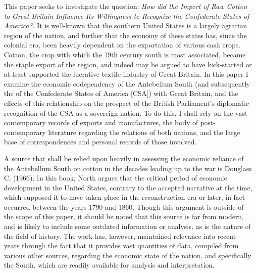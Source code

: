 
This paper seeks to investigate the question: \flq{} \textit{How did the Import of Raw Cotton to Great Britain Influence Its Willingness to Recognize the
Confederate States of America?}\frq{}. It is well-known that the southern United States is a largely agrarian region of the nation, and further that the 
economy of these states has, since the colonial era, been heavily dependent on the exportation of various \flq{}cash crops\frq{}. Cotton, the crop with which 
the 19th century south is most associated, became the staple export of the region, and indeed may be argued to have kick-started or at least supported the 
lucrative textile industry of Great Britain. In this paper I examine the economic codependency of the Antebellum South (and subsequently the of the 
Confederate States of America [CSA]) with Great Britain, and the effects of this relationship on the prospect of the British Parliament's diplomatic 
recognition of the CSA as a sovereign nation. To do this, I shall rely on the vast contemporary records of exports and manufactures, the body of post-
contemporary literature regarding the relations of both nations, and the large base of correspondences and personal records of those involved.

A source that shall be relied upon heavily in assessing the economic reliance of the Antebellum South on cotton in the decades leading up to the war is 
Douglass C.  (1966). In this book, North argues that the critical period of economic development in the United States, 
contrary to the accepted narrative at the time, which supposed it to have taken place in the reconstruction era or later, in fact occurred between the
years 1790 and 1860. Though this argument is outside of the scope of this paper, it should be noted that this source is far from modern, and is likely
to include some outdated information or analysis, as is the nature of the field of history. The work has, however, maintained relevance into recent years
through the fact that it provides vast quantities of data, compiled from various other sources, regarding the economic state of the nation, and specifically
the South, which are readily available for analysis and interpretation.

